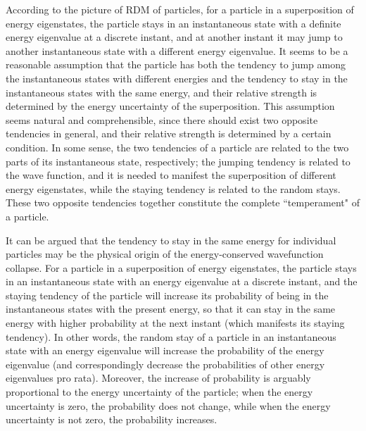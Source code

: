 
According to the picture of RDM of particles, for a particle in a superposition of energy eigenstates, the particle stays in an instantaneous state with a definite energy eigenvalue at a discrete instant, and at another instant it may jump to another instantaneous state with a different energy eigenvalue. It seems to be a reasonable assumption that the particle has both the tendency to jump among the instantaneous states with different energies and the tendency to stay in the instantaneous states with the same energy, and their relative strength is determined by the energy uncertainty of the superposition. This assumption seems natural and comprehensible, since there should exist two opposite tendencies in general, and their relative strength is determined by a certain condition. In some sense, the two tendencies of a particle are related to the two parts of its instantaneous state, respectively; the jumping tendency is related to the wave function, and it is needed to manifest the superposition of different energy eigenstates, while the staying tendency is related to the random stays. These two opposite tendencies together constitute the complete ``temperament" of a particle.

It can be argued that the tendency to stay in the same energy for individual particles may be the physical origin of the energy-conserved wavefunction collapse. For a particle in a superposition of energy eigenstates, the particle stays in an instantaneous state with an energy eigenvalue at a discrete instant, and the staying tendency of the particle will increase its probability of being in the instantaneous states with the present energy, so that it can stay in the same energy with higher probability at the next instant (which manifests its staying tendency).
In other words, the random stay of a particle in an instantaneous state with an energy eigenvalue will increase the probability of the energy eigenvalue (and correspondingly decrease the probabilities of other energy eigenvalues pro rata). Moreover, the increase of probability is arguably proportional to the energy uncertainty of the particle; when  the energy uncertainty is zero, the probability does not change, while when the energy uncertainty is not zero, the probability increases.

